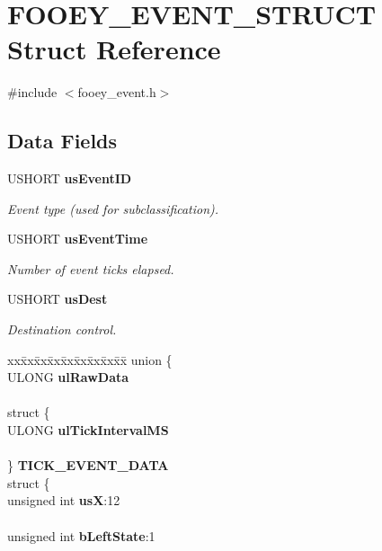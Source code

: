\section{FOOEY\_\-EVENT\_\-STRUCT Struct Reference}
\label{struct_f_o_o_e_y___e_v_e_n_t___s_t_r_u_c_t}


{\ttfamily \#include $<$fooey\_\-event.h$>$}\subsection*{Data Fields}
\begin{DoxyCompactItemize}
\item 
USHORT {\bf usEventID}
\begin{DoxyCompactList}\small\item\em Event type (used for subclassification). \item\end{DoxyCompactList}\item 
USHORT {\bf usEventTime}
\begin{DoxyCompactList}\small\item\em Number of event ticks elapsed. \item\end{DoxyCompactList}\item 
USHORT {\bf usDest}
\begin{DoxyCompactList}\small\item\em Destination control. \item\end{DoxyCompactList}\item 
\begin{tabbing}
xx\=xx\=xx\=xx\=xx\=xx\=xx\=xx\=xx\=\kill
union \{\\
\>ULONG {\bf ulRawData}\\
\>\\
\>struct \{\\
\>\>ULONG {\bf ulTickIntervalMS}\\
\>\>\\
\>\} {\bf TICK\_EVENT\_DATA}\\
\>struct \{\\
\>\>unsigned int {\bf usX}:12\\
\>\>\\
\>\>unsigned int {\bf bLeftState}:1\\

\end{tabbing}
\end{DoxyCompactItemize}
